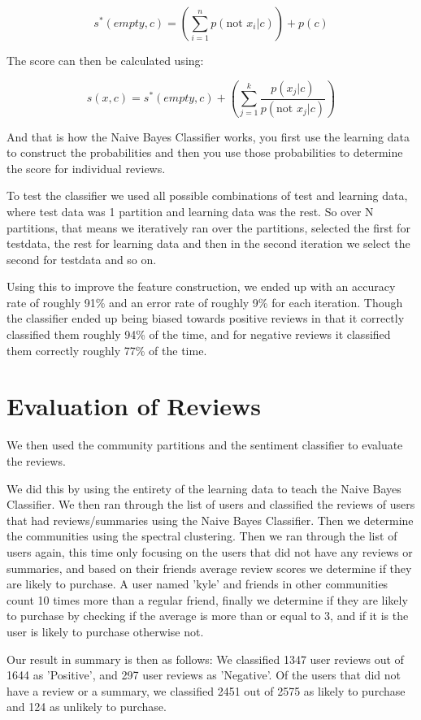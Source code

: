 	$$s^{*}(empty, c) = (\sum\limits_{i=1}^{n} p(\text{not } x_i | c)) + p(c)$$
	
	The score can then be calculated using:
	
	$$s(x, c) = s^{*}(empty, c) + (\sum\limits_{j=1}^{k} \frac{p(x_{j}|c)}{p(\text{not } x_{j}|c)})$$
	
	And that is how the Naive Bayes Classifier works, you first use the learning data to construct the probabilities and then you use those probabilities to determine the score for individual reviews.
	
	To test the classifier we used all possible combinations of test and learning data, where test data was 1 partition and learning data was the rest. So over N partitions, that means we iteratively ran over the partitions, selected the first for testdata, the rest for learning data and then in the second iteration we select the second for testdata and so on.
	
	Using this to improve the feature construction, we ended up with an accuracy rate of roughly 91\% and an error rate of roughly 9\% for each iteration. Though the classifier ended up being biased towards positive reviews in that it correctly classified them roughly 94\% of the time, and for negative reviews it classified them correctly roughly 77\% of the time.
	
	\section{Evaluation of Reviews}
	We then used the community partitions and the sentiment classifier to evaluate the reviews. 

	We did this by using the entirety of the learning data to teach the Naive Bayes Classifier.
	We then ran through the list of users and classified the reviews of users that had reviews/summaries using the Naive Bayes Classifier.
	Then we determine the communities using the spectral clustering.
	Then we ran through the list of users again, this time only focusing on the users that did not have any reviews or summaries, and based on their friends average review scores we determine if they are likely to purchase. A user named 'kyle' and friends in other communities count 10 times more than a regular friend, finally we determine if they are likely to purchase by checking if the average is more than or equal to 3, and if it is the user is likely to purchase otherwise not.
	
	Our result in summary is then as follows:
	We classified 1347 user reviews out of 1644 as 'Positive', and 297 user reviews as 'Negative'.
	Of the users that did not have a review or a summary, we classified 2451 out of 2575 as likely to purchase and 124 as unlikely to purchase.
	
	


